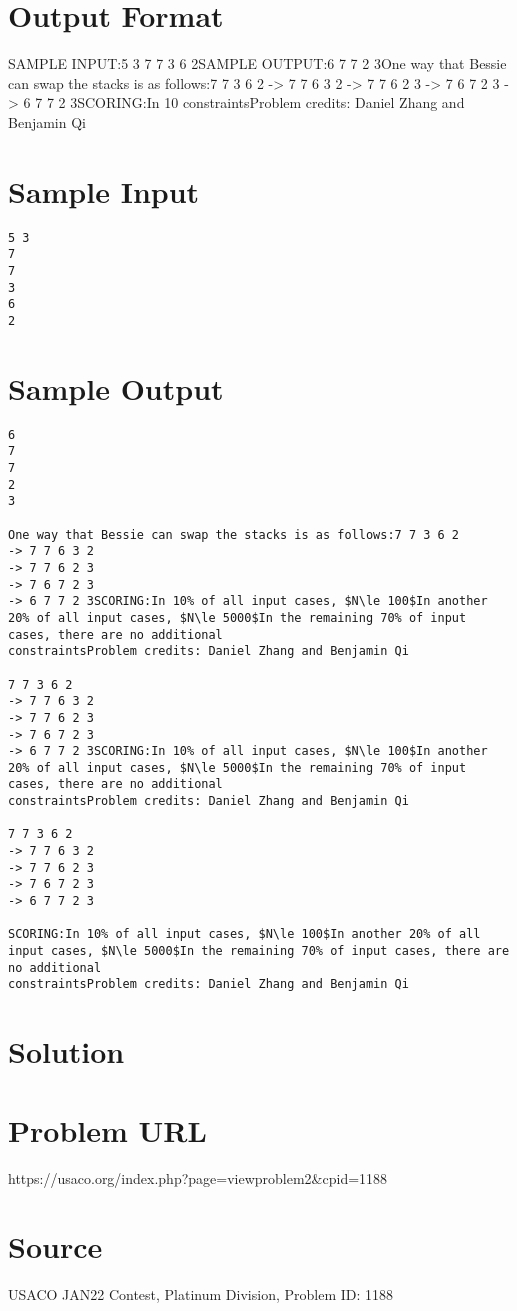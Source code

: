 \documentclass[12pt]{article}
\begin{document}
\section*{Output Format}
SAMPLE INPUT:5 3
7
7
3
6
2SAMPLE OUTPUT:6
7
7
2
3One way that Bessie can swap the stacks is as follows:7 7 3 6 2
-> 7 7 6 3 2
-> 7 7 6 2 3
-> 7 6 7 2 3
-> 6 7 7 2 3SCORING:In 10%
constraintsProblem credits: Daniel Zhang and Benjamin Qi

\section*{Sample Input}
\begin{verbatim}
5 3
7
7
3
6
2
\end{verbatim}

\section*{Sample Output}
\begin{verbatim}
6
7
7
2
3

One way that Bessie can swap the stacks is as follows:7 7 3 6 2
-> 7 7 6 3 2
-> 7 7 6 2 3
-> 7 6 7 2 3
-> 6 7 7 2 3SCORING:In 10% of all input cases, $N\le 100$In another 20% of all input cases, $N\le 5000$In the remaining 70% of input cases, there are no additional
constraintsProblem credits: Daniel Zhang and Benjamin Qi

7 7 3 6 2
-> 7 7 6 3 2
-> 7 7 6 2 3
-> 7 6 7 2 3
-> 6 7 7 2 3SCORING:In 10% of all input cases, $N\le 100$In another 20% of all input cases, $N\le 5000$In the remaining 70% of input cases, there are no additional
constraintsProblem credits: Daniel Zhang and Benjamin Qi

7 7 3 6 2
-> 7 7 6 3 2
-> 7 7 6 2 3
-> 7 6 7 2 3
-> 6 7 7 2 3

SCORING:In 10% of all input cases, $N\le 100$In another 20% of all input cases, $N\le 5000$In the remaining 70% of input cases, there are no additional
constraintsProblem credits: Daniel Zhang and Benjamin Qi
\end{verbatim}

\section*{Solution}


\section*{Problem URL}
https://usaco.org/index.php?page=viewproblem2&cpid=1188

\section*{Source}
USACO JAN22 Contest, Platinum Division, Problem ID: 1188
\end{document}

